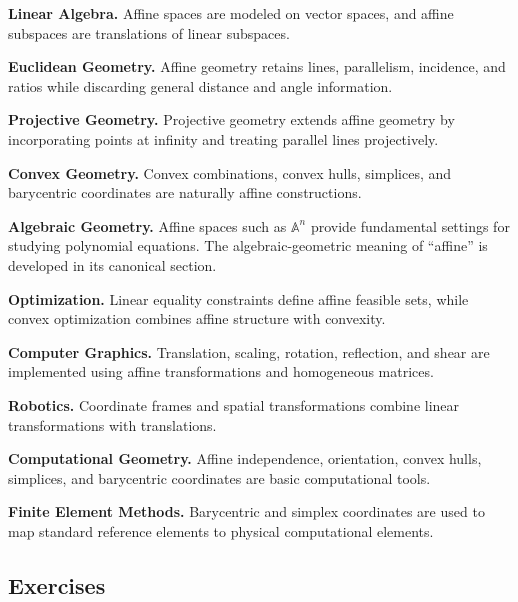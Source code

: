 \begin{applicationbox}
\textbf{Linear Algebra.}
Affine spaces are modeled on vector spaces, and affine subspaces are
translations of linear subspaces.

\medskip

\textbf{Euclidean Geometry.}
Affine geometry retains lines, parallelism, incidence, and ratios while
discarding general distance and angle information.

\medskip

\textbf{Projective Geometry.}
Projective geometry extends affine geometry by incorporating points at
infinity and treating parallel lines projectively.

\medskip

\textbf{Convex Geometry.}
Convex combinations, convex hulls, simplices, and barycentric coordinates are
naturally affine constructions.

\medskip

\textbf{Algebraic Geometry.}
Affine spaces such as \(\mathbb{A}^n\) provide fundamental settings for
studying polynomial equations. The algebraic-geometric meaning of
``affine'' is developed in its canonical section.

\medskip

\textbf{Optimization.}
Linear equality constraints define affine feasible sets, while convex
optimization combines affine structure with convexity.

\medskip

\textbf{Computer Graphics.}
Translation, scaling, rotation, reflection, and shear are implemented using
affine transformations and homogeneous matrices.

\medskip

\textbf{Robotics.}
Coordinate frames and spatial transformations combine linear transformations
with translations.

\medskip

\textbf{Computational Geometry.}
Affine independence, orientation, convex hulls, simplices, and barycentric
coordinates are basic computational tools.

\medskip

\textbf{Finite Element Methods.}
Barycentric and simplex coordinates are used to map standard reference
elements to physical computational elements.
\end{applicationbox}

\subsection{Exercises}
\label{subsec:affine-geometry-exercises}

